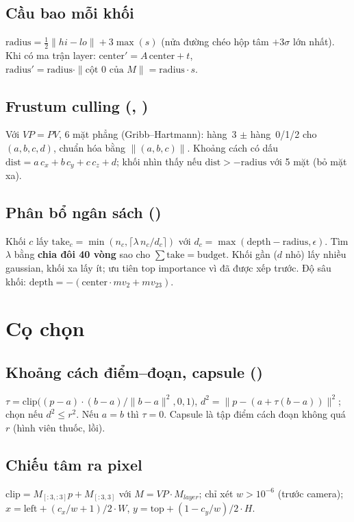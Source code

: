 \subsection{Cầu bao mỗi khối}
$\mathrm{radius}=\tfrac12\|hi-lo\|+3\max(s)$ (nửa đường chéo hộp tâm $+3\sigma$ lớn nhất). Khi có ma trận layer: $\mathrm{center}'=A\,\mathrm{center}+t$, $\mathrm{radius}'=\mathrm{radius}\cdot\|\text{cột 0 của }M\|=\mathrm{radius}\cdot s$.

\subsection{Frustum culling (, )}
Với $VP=PV$, 6 mặt phẳng (Gribb--Hartmann): hàng~3 $\pm$ hàng~0/1/2 cho $(a,b,c,d)$, chuẩn hóa bằng $\|(a,b,c)\|$. Khoảng cách có dấu $\mathrm{dist}=a\,c_x+b\,c_y+c\,c_z+d$; khối nhìn thấy nếu $\mathrm{dist}>-\mathrm{radius}$ với 5 mặt (bỏ mặt xa).

\subsection{Phân bổ ngân sách ()}
Khối $c$ lấy $\mathrm{take}_c=\min(n_c,\lceil\lambda\,n_c/d_c\rceil)$ với $d_c=\max(\mathrm{depth}-\mathrm{radius},\epsilon)$. Tìm $\lambda$ bằng \textbf{chia đôi 40 vòng} sao cho $\sum\mathrm{take}=\mathrm{budget}$. Khối gần ($d$ nhỏ) lấy nhiều gaussian, khối xa lấy ít; ưu tiên top importance vì đã được xếp trước. Độ sâu khối: $\mathrm{depth}=-(\mathrm{center}\cdot mv_2+mv_{23})$.

\section{Cọ chọn}\label{s:brush}

\subsection{Khoảng cách điểm--đoạn, capsule ()}
$\tau=\mathrm{clip}\!\big((p-a)\cdot(b-a)/\|b-a\|^2,0,1\big)$, $d^2=\|p-(a+\tau(b-a))\|^2$; chọn nếu $d^2\le r^2$. Nếu $a=b$ thì $\tau=0$. Capsule là tập điểm cách đoạn không quá $r$ (hình viên thuốc, lồi).

\subsection{Chiếu tâm ra pixel}
$\mathrm{clip}=M_{[:3,:3]}p+M_{[:3,3]}$ với $M=VP\cdot M_{layer}$; chỉ xét $w>10^{-6}$ (trước camera); $x=\mathrm{left}+(c_x/w+1)/2\cdot W$, $y=\mathrm{top}+(1-c_y/w)/2\cdot H$.

